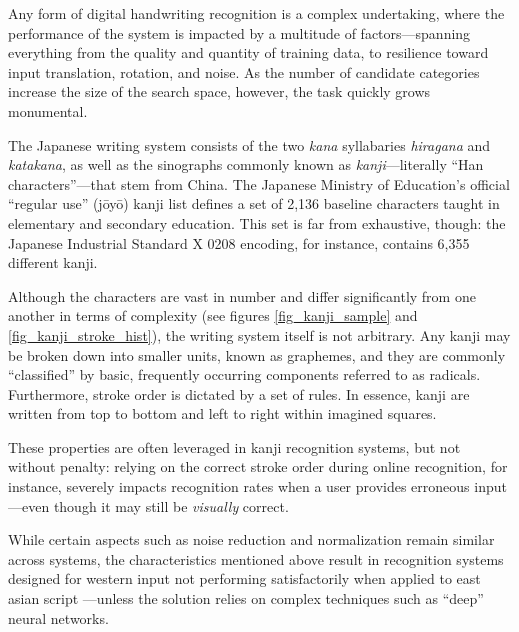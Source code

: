 \documentclass[10pt,conference,a4paper]{IEEEtran}
\begin{document}
	Any form of digital handwriting recognition is a complex undertaking,
	where the performance of the system is impacted by a multitude of factors---spanning
	everything from the quality and quantity of training data, to resilience toward input
	translation, rotation, and noise. As the number of candidate categories increase
	the size of the search space, however, the task quickly grows monumental.

	The Japanese writing system consists of the two \emph{kana} syllabaries \emph{hiragana} and \emph{katakana},
	as well as the sinographs commonly known as \emph{kanji}---literally ``Han characters''---that stem from China.
	The Japanese Ministry of Education's \mbox{official} ``regular use'' (j\=oy\=o) kanji list defines a set of 2,136
	baseline characters taught in elementary and secondary education. \cite{hadamitzky2012japanese}
	This set is far from exhaustive, though: the Japanese Industrial Standard X 0208 encoding, for instance, contains 6,355 different kanji.

	Although the characters are vast in number and differ significantly from one another in terms of complexity (see figures \ref{fig_kanji_sample}
	and \ref{fig_kanji_stroke_hist}), the writing system itself is not arbitrary. Any kanji may be broken down into smaller units, known as graphemes, 
	and they are commonly ``classified'' by basic, frequently occurring components referred to as radicals.
	Furthermore, stroke order is dictated by a set of rules. In essence, kanji are written from top to bottom and left to right within imagined squares. \cite{foerster1994kanji}

	These properties are often leveraged in kanji recognition systems, but not without penalty: relying on the correct stroke order during online
	recognition, for instance, severely impacts recognition rates when a user provides erroneous input---even though it may still be \emph{visually} correct. \cite{shin2002optimal}

	While certain aspects such as noise reduction and normalization remain similar across systems, the characteristics mentioned above result in
	recognition systems designed for western input not performing satisfactorily when applied to east asian script \cite{jager2003state, tappert1990state}%
	---unless the solution relies on complex techniques such as  ``deep'' neural networks. \cite{ciresan2012multi}


\end{document}
